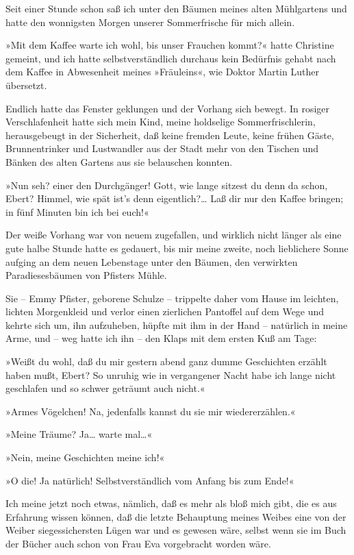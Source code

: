 Seit einer Stunde schon saß ich unter den Bäumen meines alten
Mühlgartens und hatte den wonnigsten Morgen unserer Sommerfrische
für mich allein.

»Mit dem Kaffee warte ich wohl, bis unser Frauchen kommt?« hatte
Christine gemeint, und ich hatte selbstverständlich durchaus kein
Bedürfnis gehabt nach dem Kaffee in Abwesenheit meines »Fräuleins«,
wie Doktor Martin Luther übersetzt.

Endlich hatte das Fenster geklungen und der Vorhang sich bewegt. In
rosiger Verschlafenheit hatte sich mein Kind, meine holdselige
Sommerfrischlerin, herausgebeugt in der Sicherheit, daß keine
fremden Leute, keine frühen Gäste, Brunnentrinker und Lustwandler
aus der Stadt mehr von den Tischen und Bänken des alten Gartens aus
sie belauschen konnten.

»Nun seh? einer den Durchgänger! Gott, wie lange sitzest du denn da
schon, Ebert? Himmel, wie spät ist's denn eigentlich?\ldots{} Laß dir
nur den Kaffee bringen; in fünf Minuten bin ich bei euch!«

Der weiße Vorhang war von neuem zugefallen, und wirklich nicht
länger als eine gute halbe Stunde hatte es gedauert, bis mir meine
zweite, noch lieblichere Sonne aufging an dem neuen Lebenstage
unter den Bäumen, den verwirkten Paradiesesbäumen von Pfisters
Mühle.

Sie – Emmy Pfister, geborene Schulze – trippelte daher vom Hause im
leichten, lichten Morgenkleid und verlor einen zierlichen Pantoffel
auf dem Wege und kehrte sich um, ihn aufzuheben, hüpfte mit ihm in
der Hand – natürlich in meine Arme, und – weg hatte ich ihn – den
Klaps mit dem ersten Kuß am Tage:

»Weißt du wohl, daß du mir gestern abend ganz dumme Geschichten
erzählt haben mußt, Ebert? So unruhig wie in vergangener Nacht habe
ich lange nicht geschlafen und so schwer geträumt auch nicht.«

»Armes Vögelchen! Na, jedenfalls kannst du sie mir
wiedererzählen.«

»Meine Träume? Ja\ldots{} warte mal\ldots{}«

»Nein, meine Geschichten meine ich!«

»O die! Ja natürlich! Selbstverständlich vom Anfang bis zum Ende!«

Ich meine jetzt noch etwas, nämlich, daß es mehr als bloß mich
gibt, die es aus Erfahrung wissen können, daß die letzte Behauptung
meines Weibes eine von der Weiber siegessichersten Lügen war und es
gewesen wäre, selbst wenn sie im Buch der Bücher auch schon von
Frau Eva vorgebracht worden wäre.

